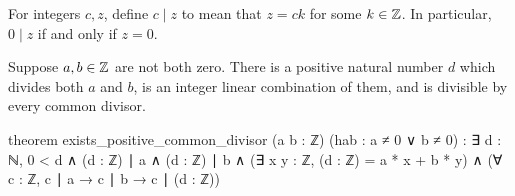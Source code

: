 For integers $c,z$, define $c\mid z$ to mean that $z=ck$ for some $k\in\mathbb{Z}$.
In particular, $0\mid z$ if and only if $z=0$.

\begin{theorem}
  \label{ent:thm:positive-common-divisor}
  Suppose $a,b\in\mathbb{Z}$ are not both zero.
  There is a positive natural number $d$ which divides both $a$ and $b$, is an integer linear
  combination of them, and is divisible by every common divisor.

  \begin{lean}
    theorem exists_positive_common_divisor (a b : ℤ) (hab : a ≠ 0 ∨ b ≠ 0) :
        ∃ d : ℕ, 0 < d ∧ (d : ℤ) ∣ a ∧ (d : ℤ) ∣ b ∧
          (∃ x y : ℤ, (d : ℤ) = a * x + b * y) ∧
          (∀ c : ℤ, c ∣ a → c ∣ b → c ∣ (d : ℤ))
  \end{lean}
\end{theorem}


